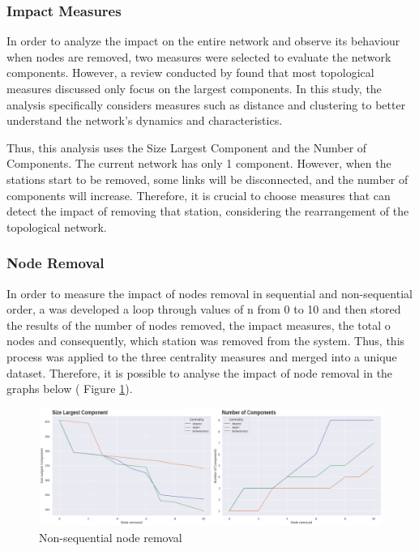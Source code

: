 \documentclass[10pt]{report}
\numberwithin{figure}{section}
\numberwithin{table}{section}
\begin{document}
\newpage    

\subsubsection{Impact Measures} 



In order to analyze the impact on the entire network and observe its behaviour when nodes are removed, two measures were selected to evaluate the network components. However, a review conducted by \cite{jamakovic_relationships_2008} found that most topological measures discussed only focus on the largest components. In this study, the analysis specifically considers measures such as distance and clustering to better understand the network's dynamics and characteristics.

Thus,  this analysis uses the Size Largest Component and the Number of Components. The current network has only 1 component. However, when the stations start to be removed, some links will be disconnected, and the number of components will increase. Therefore, it is crucial to choose measures that can detect the impact of removing that station, considering the rearrangement of the topological network. 

\subsubsection{Node Removal} 

In order to measure the impact of nodes removal in sequential and non-sequential order, a was developed a loop through values of n from 0 to 10 and then stored the results of the number of nodes removed, the impact measures, the total o nodes and consequently, which station was removed from the system. Thus, this process was applied to the three centrality measures and merged into a unique dataset. Therefore, it is possible to analyse the impact of node removal in the graphs below ( Figure \ref{fig:Part1_nonsequential_Summarise}). 


    \begin{figure}[htp]
        \centering
        \includegraphics[width=16cm]{Image/Part1_nonsequential_Summarise.png}
        \caption{Non-sequential node removal}
        \label{fig:Part1_nonsequential_Summarise}
    \end{figure}
\end{document}
